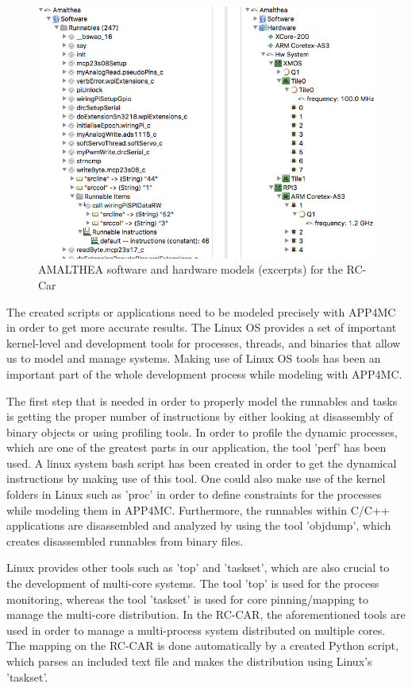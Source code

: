 \documentclass [a4paper,final,conference,10pt]{IDAACS}
\begin{document}
\begin{figure}[bth]
	\centering
	\includegraphics[scale=0.34]{images/models.png}
	\caption{\label{fig:model}AMALTHEA software and hardware models (excerpts) for the RC-Car}
\end{figure}


The created scripts or applications need to be modeled precisely with APP4MC in order to get more accurate results. The Linux OS provides a set of important kernel-level and development tools for processes, threads, and binaries that allow us to model and manage systems. %
Making use of Linux OS tools has been an important part of the whole development process while modeling with APP4MC.

The first step that is needed in order to properly model the runnables and tasks is getting the proper number of instructions by either looking at disassembly of binary objects or using profiling tools. 
In order to profile the dynamic processes, which are one of the greatest parts in our application, the tool 'perf' has been used. 
A linux system bash script has been created in order to get the dynamical instructions by making use of this tool.
One could also make use of the kernel folders in Linux such as 'proc' in order to define constraints for the processes while modeling them in APP4MC.
Furthermore, the runnables within C/C++ applications are disassembled and analyzed by using the tool 'objdump', which creates disassembled runnables from binary files.

Linux provides other tools such as 'top' and 'taskset', which are also crucial to the development of multi-core systems. 
The tool 'top' is used for the process monitoring, whereas the tool 'taskset' is used for core pinning/mapping to manage the multi-core distribution.
In the RC-CAR, the aforementioned tools are used in order to manage a multi-process system distributed on multiple cores.
The mapping on the RC-CAR is done automatically by a created Python script, which parses an included text file and makes the distribution using Linux's 'taskset'.
\end{document}

